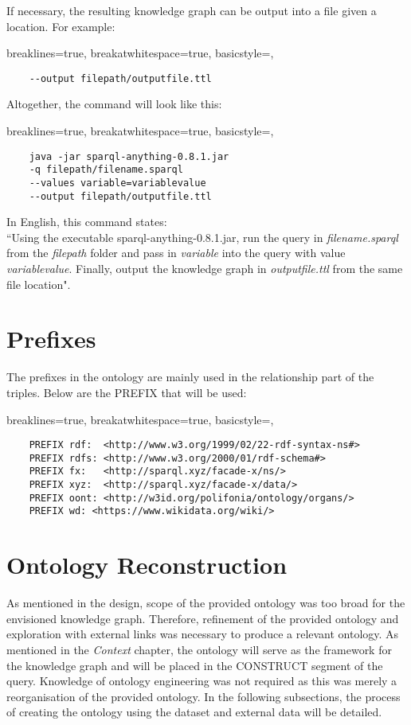 \noindent If necessary, the resulting knowledge graph can be output into a file given a location. For example:

\lstset
{
    breaklines=true,
    breakatwhitespace=true,
    basicstyle=\linespread{1.5}\ttfamily,
}
\begin{lstlisting}
    --output filepath/outputfile.ttl
\end{lstlisting}

\noindent Altogether, the command will look like this:

\lstset
{
    breaklines=true,
    breakatwhitespace=true,
    basicstyle=\linespread{1.5}\ttfamily,
}
\begin{lstlisting}
    java -jar sparql-anything-0.8.1.jar
    -q filepath/filename.sparql 
    --values variable=variablevalue 
    --output filepath/outputfile.ttl
\end{lstlisting}

\noindent In English, this command states: \\
\hspace*{0.5cm} ``Using the executable sparql-anything-0.8.1.jar, run the query in \textit{filename.sparql} from the \textit{filepath} folder and pass in \textit{variable} into the query with value \textit{variablevalue}. Finally, output the knowledge graph in \textit{outputfile.ttl} from the same file location". 

\section{Prefixes}
\hspace*{0.5cm} The prefixes in the ontology are mainly used in the relationship part of the triples. Below are the PREFIX that will be used:

\lstset
{
    breaklines=true,
    breakatwhitespace=true,
    basicstyle=\linespread{1.5}\ttfamily,
}
\begin{lstlisting}
    PREFIX rdf:  <http://www.w3.org/1999/02/22-rdf-syntax-ns#>
    PREFIX rdfs: <http://www.w3.org/2000/01/rdf-schema#>
    PREFIX fx:   <http://sparql.xyz/facade-x/ns/>
    PREFIX xyz:  <http://sparql.xyz/facade-x/data/>
    PREFIX oont: <http://w3id.org/polifonia/ontology/organs/>
    PREFIX wd: <https://www.wikidata.org/wiki/> 
\end{lstlisting}

\section{Ontology Reconstruction}
\hspace*{0.5cm} As mentioned in the design, scope of the provided ontology was too broad for the envisioned knowledge graph. Therefore, refinement of the provided ontology and exploration with external links was necessary to produce a relevant ontology. As mentioned in the \textit{Context} chapter, the ontology will serve as the framework for the knowledge graph and will be placed in the CONSTRUCT segment of the query. Knowledge of ontology engineering was not required as this was merely a reorganisation of the provided ontology. In the following subsections, the process of creating the ontology using the dataset and external data will be detailed.

